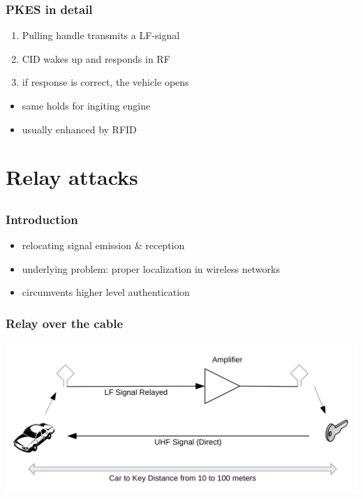 \documentclass[12pt]{beamer}
\begin{document}
	\begin{frame}
		\frametitle{PKES in detail}
		\begin{enumerate}
			\item Pulling handle transmits a LF-signal
			\item CID wakes up and responds in RF
			\item if response is correct, the vehicle opens
		\end{enumerate}
		\begin{itemize}
			\item same holds for ingiting engine
			\item usually enhanced by RFID
		\end{itemize}
	\end{frame}

\section{Relay attacks}
\subsection*{}
	\begin{frame}
	\frametitle{Introduction}
		\begin{itemize}
			\item relocating signal emission \& reception
			\item underlying problem: proper localization in wireless networks
			\item circumvents higher level authentication
		\end{itemize}
	\end{frame}
	
	\begin{frame}
	\frametitle{Relay over the cable}
		\begin{center}
			\includegraphics[scale=0.85]{img/franc_relay_over_the_wire.png} 
		\end{center}
	\end{frame}
	
\end{document}
